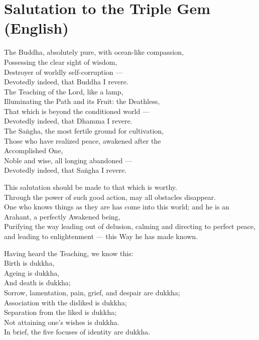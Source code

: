 \section*{Salutation to the Triple Gem (English)}

\begin{leader}
\end{leader}

The Buddha, absolutely pure, with ocean-like compassion,\\
Possessing the clear sight of wisdom,\\
Destroyer of worldly self-corruption ---\\
Devotedly indeed, that Buddha I revere.\\
The Teaching of the Lord, like a lamp,\\
Illuminating the Path and its Fruit: the Deathless,\\
That which is beyond the conditioned world ---\\
Devotedly indeed, that Dhamma I revere.\\
The Saṅgha, the most fertile ground for cultivation,\\
Those who have realized peace, awakened after the \\Accomplished One,\\
Noble and wise, all longing abandoned ---\\
Devotedly indeed, that Saṅgha I revere.

This salutation should be made to that which is worthy.\\
Through the power of such good action, may all obstacles disappear.\\
One who knows things as they are has come into this world; and he is an Arahant, a perfectly Awakened being,\\
Purifying the way leading out of delusion, calming and directing to perfect peace, and leading to enlightenment --- this Way he has made known.

Having heard the Teaching, we know this:\\
Birth is dukkha,\\
Ageing is dukkha,\\
And death is dukkha;\\
Sorrow, lamentation, pain, grief, and despair are dukkha;\\
Association with the disliked is dukkha;\\
Separation from the liked is dukkha;\\
Not attaining one's wishes is dukkha.\\
In brief, the five focuses of identity are dukkha.

